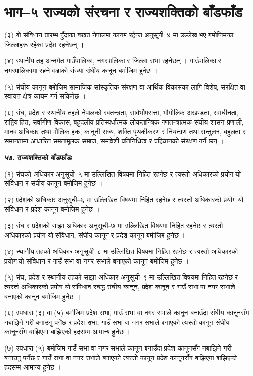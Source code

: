 \section{भाग–५ राज्यको संरचना र राज्यशक्तिको बाँडफाँड}

(३) यो संविधान प्रारम्भ हुँदाका बखत नेपालमा कायम रहेका अनुसूची–४ मा उल्लेख भए बमोजिमका जिल्लाहरू रहेका प्रदेश रहनेछन् ।

(४) स्थानीय तह अन्तर्गत गाउँँपालिका, नगरपालिका र जिल्ला सभा रहनेछन् । गाउँपालिका र नगरपालिकामा रहने वडाको संख्या संघीय कानून बमोजिम हुनेछ ।

(५) संघीय कानून बमोजिम सामाजिक सांस्कृतिक संरक्षण वा आर्थिक विकासका लागि विशेष, संरक्षित वा स्वायत्त क्षेत्र कायम गर्न सकिनेछ ।

(६) संघ, प्रदेश र स्थानीय तहले नेपालको स्वतन्त्रता, सार्वभौमसत्ता, भौगोलिक अखण्डता, स्वाधीनता, राष्ट्रिय हित, सर्वांगीण विकास, बहुदलीय प्रतिस्पर्धात्मक लोकतान्त्रिक गणतन्त्रात्मक संघीय शासन प्रणाली, मानव अधिकार तथा मौलिक हक, कानूनी राज्य, शक्ति पृथकीकरण र नियन्त्रण तथा सन्तुलन, बहुलता र समानतामा आधारित समतामूलक समाज, समावेशी प्रतिनिधित्व र पहिचानको संरक्षण गर्ने छन् ।

\textbf{५७. राज्यशक्तिको बाँडफाँडः}

(१) संघको अधिकार अनुसूची–५ मा उल्लिखित विषयमा निहित रहनेछ र त्यस्तो अधिकारको प्रयोग यो संविधान र संघीय कानून बमोजिम हुनेछ ।

(२) प्रदेशको अधिकार अनुसूची–६ मा उल्लिखित विषयमा निहित रहनेछ र त्यस्तो अधिकारको प्रयोग यो संविधान र प्रदेश कानून बमोजिम
हुनेछ ।

(३) संघ र प्रदेशको साझा अधिकार अनुसूची–७ मा उल्लिखित विषयमा निहित रहनेछ र त्यस्तो अधिकारको प्रयोग यो संविधान, संघीय
कानून र प्रदेश कानून बमोजिम हुनेछ ।

(४) स्थानीय तहको अधिकार अनुसूची–८ मा उल्लिखित विषयमा निहित रहनेछ र त्यस्तो अधिकारको प्रयोग यो संविधान र गाउँ सभा वा
नगर सभाले बनाएको कानून बमोजिम हुनेछ ।

(५) संघ, प्रदेश र स्थानीय तहको साझा अधिकार अनुसूची–९ मा उल्लिखित विषयमा निहित रहनेछ र त्यस्तो अधिकारको प्रयोग यो संविधान रघद्ध संघीय कानून, प्रदेश कानून र गाउँ सभा वा नगर सभाले बनाएको कानून बमोजिम हुनेछ ।

(६) उपधारा (३) वा (५) बमोजिम प्रदेश सभा, गाउँ सभा वा नगर सभाले कानून बनाउँदा संघीय कानूनसँग नबाझिने गरी बनाउनु पर्नेछ र प्रदेश सभा, गाउँ सभा वा नगर सभाले बनाएको त्यस्तो कानून संघीय कानूनसँग बाझिएमा बाझिएको हदसम्म आमान्य हुनेछ ।

(७) उपधारा (५) बमोजिम गाउँ सभा वा नगर सभाले कानून बनाउँदा प्रदेश कानूनसँग नबाझिने गरी बनाउनु पर्नेछ र गाउँ सभा वा
नगर सभाले बनाएको त्यस्तो कानून प्रदेश कानूनसँग बाझिएमा बाझिएको हदसम्म आमान्य हुनेछ ।

